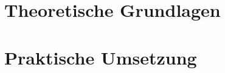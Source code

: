 




\frenchspacing
\raggedbottom
{} %
\pagestyle{plain}

\condTWOSIDE{}
\cleardoublepage
\condLOCK{\cleardoublepage}
\condDOUBLESPACING{\onehalfspacing}
\cleardoublepage
\cleardoublepage
\pagestyle{scrheadings}
\cleardoublepage
\cleardoublepage
\cleardoublepage
\cleardoublepage
\cleardoublepage
\setcounter{page}{1}
\cleardoublepage\part{Theoretische Grundlagen}


\cleardoublepage\part{Praktische Umsetzung}


\appendix

%

\cleardoublepage

